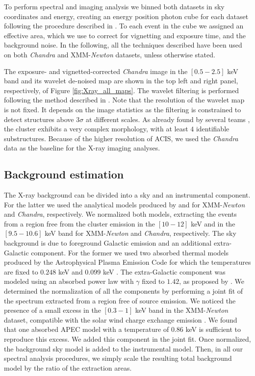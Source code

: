 \documentclass[twocolumn,traditabstract]{aa}
\begin{document}
To perform spectral and imaging analysis we binned both datasets in sky coordinates and energy, creating an energy position photon cube for each dataset following the procedure described in \cite{bourdin2008}. To each event in the cube we assigned an effective area, which we use to correct for vignetting and exposure time, and the background noise. In the following, all the techniques described have been used on both \textit{Chandra} and XMM-\textit{Newton} datasets, unless otherwise stated.

The exposure- and vignetted-corrected \textit{Chandra} image in the $[0.5-2.5]$ keV band and its wavelet de-noised map are shown in the top left and right panel, respectively, of Figure \ref{fig:Xray_all_maps}. The wavelet filtering is performed following the method described in \cite{bourdin2013}. Note that the resolution of the wavelet map is not fixed. It depends on the image statistics as the filtering is constrained to detect structures above $3\sigma$ at different scales. As already found by several teams \citep[e.g.,][]{Zitrin2009,Ma2009}, the cluster exhibits a very complex morphology, with at least $4$ identifiable substructures. Because of the higher resolution of ACIS, we used the \textit{Chandra} data as the baseline for the X-ray imaging analyses.

\subsection{Background estimation}
The X-ray background can be divided into a sky and an instrumental component. For the latter we used the analytical models produced by \cite{bourdin2013} and \cite{bartalucci2014} for XMM-\textit{Newton} and \textit{Chandra}, respectively. We normalized both models, extracting the events from a region free from the cluster emission in the $[10-12]$ keV and in the $[9.5-10.6]$ keV band for XMM-\textit{Newton} and \textit{Chandra}, respectively. The sky background is due to foreground Galactic emission and an additional  extra-Galactic component. For the former we used two absorbed thermal models produced by the Astrophysical Plasma Emission Code \citep[APEC,][]{smith2001} for which the temperatures are fixed to $0.248$ keV and $0.099$ keV \citep[see][]{kuntz2000}. The extra-Galactic component was modeled using an absorbed power law with $\gamma$ fixed to $1.42$, as proposed by \cite{lumb2002}. We determined the normalization of all the components by performing a joint fit of the spectrum extracted from a region free of source emission. We noticed the presence of a small excess in the $[0.3-1]$ keV band in the XMM-\textit{Newton} dataset, compatible with the solar wind charge exchange emission \citep{snowden2004}. We found that one absorbed APEC model with a temperature of $0.86$ keV is sufficient to reproduce this excess. We added this component in the joint fit. Once normalized, the background sky model is added to the instrumental model. Then, in all our spectral analysis procedures, we simply scale the resulting total background model  by the ratio of the extraction areas.
\end{document}
